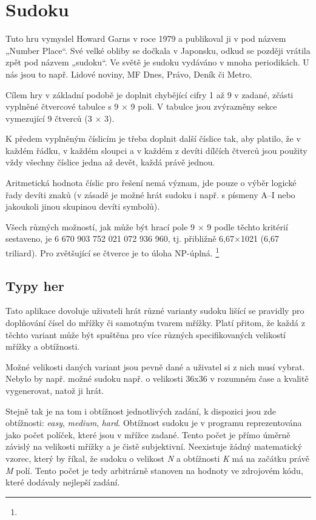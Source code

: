 \documentclass[a4paper,oneside,12pt]{report}
\begin{document}


\tableofcontents


\newpage



\setcounter{page}{1}

\chapter{Sudoku}
Tuto hru vymyslel Howard Garns v roce 1979 a publikoval ji v pod názvem „Number Place“. Své velké obliby se dočkala v Japonsku, odkud se později vrátila zpět pod názvem „sudoku“. Ve světě je sudoku vydáváno v mnoha periodikách. U nás jsou to např. Lidové noviny, MF Dnes, Právo, Deník či Metro.

Cílem hry v základní podobě je doplnit chybějící cifry 1 až 9 v zadané, zčásti vyplněné čtvercové tabulce s 9 × 9 poli. V tabulce jsou zvýrazněny sekce vymezující 9 čtverců (3 × 3).

K předem vyplněným číslicím je třeba doplnit další číslice tak, aby platilo, že v každém řádku, v každém sloupci a v každém z devíti dílčích čtverců jsou použity vždy všechny číslice jedna až devět, každá právě jednou.

Aritmetická hodnota číslic pro řešení nemá význam, jde pouze o výběr logické řady devíti znaků (v zásadě je možné hrát sudoku i např. s písmeny A–I nebo jakoukoli jinou skupinou devíti symbolů).

Všech různých možností, jak může být hrací pole 9 × 9 podle těchto kritérií sestaveno, je 6 670 903 752 021 072 936 960, tj. přibližně 6,67×1021 (6,67 triliard). Pro zvětšující se čtverce je to úloha NP-úplná.
\footnote{}

\section{Typy her}
Tato aplikace dovoluje uživateli hrát různé varianty sudoku lišící se pravidly pro doplňování čísel do mřížky či samotným tvarem mřížky. Platí přitom, že každá z těchto variant může být spuštěna pro více různých specifikovaných velikostí mřížky a obtížnosti.

Možné velikosti daných variant jsou pevně dané a uživatel si z nich musí vybrat. Nebylo by např. možné sudoku např. o velikosti 36x36 v rozumném čase a kvalitě vygenerovat, natož ji hrát.

Stejně tak je na tom i obtížnost jednotlivých zadání, k dispozici jsou zde obtížnosti: \textit{easy}, \textit{medium}, \textit{hard}. Obtížnost sudoku je v programu reprezentována jako počet políček, které jsou v mřížce zadané. Tento počet je přímo úměrně závislý na velikosti mřížky a je čistě subjektivní. Neexistuje žádný matematický vzorec, který by říkal, že sudoku o velikost \textit{N} a obtížnosti \textit{K} má na začátku právě \textit{M} polí. Tento počet je tedy arbitrárně stanoven na hodnoty ve zdrojovém kódu, které dodávaly nejlepší zadání.
\end{document}
